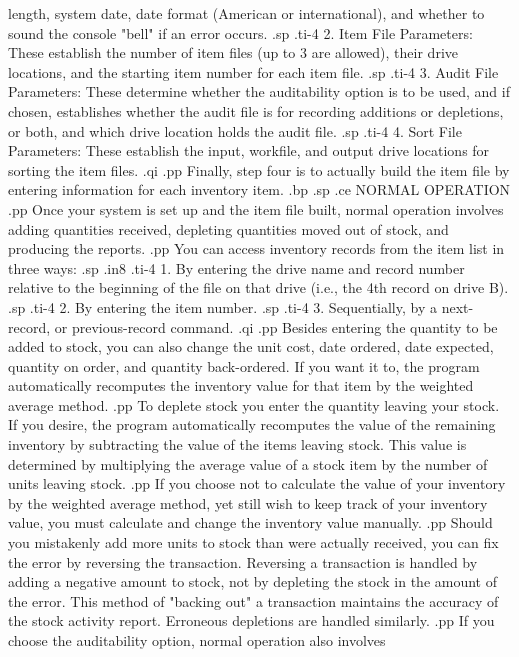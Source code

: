 length, system date, date format (American or international), and whether
to sound the console "bell" if an error occurs.
.sp
.ti-4
2.  Item File Parameters:  These establish the number of item files (up to
3 are allowed), their drive locations, and the starting item number for
each item file.
.sp
.ti-4
3.  Audit File Parameters:  These determine whether the auditability option
is to be used, and if chosen, establishes whether the audit file is for
recording additions or depletions, or both, and which drive location holds
the audit file.
.sp
.ti-4
4.  Sort File Parameters:  These establish the input, workfile, and output
drive locations for sorting the item files.
.qi
.pp
Finally, step four is to actually build the item file by entering information
for each inventory item.
.bp
.sp
.ce
NORMAL OPERATION
.pp
Once your system is set up and the item file built, normal operation involves
adding quantities received, depleting quantities moved out of stock, and
producing the reports.
.pp
You can access inventory records from the item list in three ways:
.sp
.in8
.ti-4
1.  By entering the drive name and record number relative to the beginning
of the file on that drive (i.e., the 4th record on drive B).
.sp
.ti-4
2.  By entering the item number.
.sp
.ti-4
3.  Sequentially, by a next-record, or previous-record command.
.qi
.pp
Besides entering the quantity to be added to stock, you can also change
the unit cost, date ordered, date expected, quantity on order, and quantity
back-ordered.  If you want it to, the program automatically recomputes the
inventory value for that item by the weighted average method.
.pp
To deplete stock you enter the quantity leaving your stock.  If you desire,
the program
automatically recomputes the value of the remaining inventory by
subtracting the value of the items leaving stock.  This value is determined
by multiplying the average value of a stock item by the number of units
leaving stock.
.pp
If you choose not to calculate the value of your inventory by the weighted
average method, yet still wish to keep track of your inventory value,
you must calculate and change the inventory value manually.
.pp
Should you mistakenly add more units to stock than were actually received,
you can fix the error by reversing the transaction.  Reversing a transaction
is handled by adding a negative amount to stock, not by depleting the stock
in the amount of the error.  This method of "backing out" a transaction
maintains the accuracy of the stock activity report.  Erroneous depletions
are handled similarly.
.pp
If you choose the auditability option, normal operation also involves

